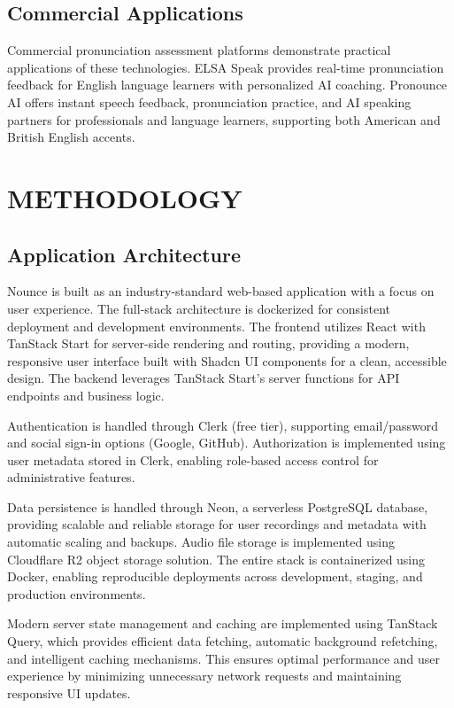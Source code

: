 \documentclass[a4paper,12pt]{report}
\begin{document}
\section{Commercial Applications}

Commercial pronunciation assessment platforms demonstrate practical applications of these technologies. ELSA Speak \cite{elsaspeak} provides real-time pronunciation feedback for English language learners with personalized AI coaching. Pronounce AI \cite{pronounce2024} offers instant speech feedback, pronunciation practice, and AI speaking partners for professionals and language learners, supporting both American and British English accents.

\chapter{METHODOLOGY}

\section{Application Architecture}

Nounce is built as an industry-standard web-based application with a focus on user experience. The full-stack architecture is dockerized for consistent deployment and development environments. The frontend utilizes React with TanStack Start for server-side rendering and routing, providing a modern, responsive user interface built with Shadcn UI components for a clean, accessible design. The backend leverages TanStack Start's server functions for API endpoints and business logic.

Authentication is handled through Clerk (free tier), supporting email/password and social sign-in options (Google, GitHub). Authorization is implemented using user metadata stored in Clerk, enabling role-based access control for administrative features.

Data persistence is handled through Neon, a serverless PostgreSQL database, providing scalable and reliable storage for user recordings and metadata with automatic scaling and backups. Audio file storage is implemented using Cloudflare R2 object storage solution. The entire stack is containerized using Docker, enabling reproducible deployments across development, staging, and production environments.

Modern server state management and caching are implemented using TanStack Query, which provides efficient data fetching, automatic background refetching, and intelligent caching mechanisms. This ensures optimal performance and user experience by minimizing unnecessary network requests and maintaining responsive UI updates.
\end{document}
